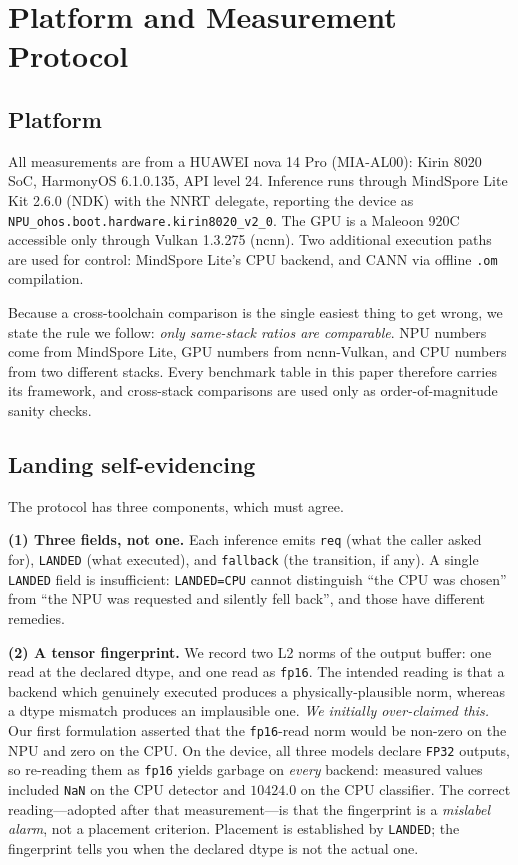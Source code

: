 \documentclass[conference]{IEEEtran}
\newcommand{\landed}{\texttt{LANDED}}
\newcommand{\reqf}{\texttt{req}}
\newcommand{\fbf}{\texttt{fallback}}
\begin{document}
\section{Platform and Measurement Protocol}
\label{sec:protocol}

\subsection{Platform}

All measurements are from a HUAWEI nova 14 Pro (MIA-AL00): Kirin 8020 SoC,
HarmonyOS 6.1.0.135, API level 24. Inference runs through MindSpore Lite Kit
2.6.0 (NDK) with the NNRT delegate, reporting the device as
\texttt{NPU\_ohos.boot.hardware.kirin8020\_v2\_0}. The GPU is a Maleoon 920C
accessible only through Vulkan 1.3.275 (ncnn). Two additional execution paths
are used for control: MindSpore Lite's CPU backend, and CANN via offline
\texttt{.om} compilation.

Because a cross-toolchain comparison is the single easiest thing to get wrong,
we state the rule we follow: \emph{only same-stack ratios are comparable}. NPU
numbers come from MindSpore Lite, GPU numbers from ncnn-Vulkan, and CPU numbers
from two different stacks. Every benchmark table in this paper therefore carries
its framework, and cross-stack comparisons are used only as order-of-magnitude
sanity checks.

\subsection{Landing self-evidencing}

The protocol has three components, which must agree.

\textbf{(1) Three fields, not one.} Each inference emits \reqf{} (what the caller
asked for), \landed{} (what executed), and \fbf{} (the transition, if any).
A single \landed{} field is insufficient: \texttt{LANDED=CPU} cannot distinguish
``the CPU was chosen'' from ``the NPU was requested and silently fell back'',
and those have different remedies.

\textbf{(2) A tensor fingerprint.} We record two L2 norms of the output buffer:
one read at the declared dtype, and one read as \texttt{fp16}. The intended
reading is that a backend which genuinely executed produces a
physically-plausible norm, whereas a dtype mismatch produces an implausible one.
\emph{We initially over-claimed this.} Our first formulation asserted that the
\texttt{fp16}-read norm would be non-zero on the NPU and zero on the CPU. On the
device, all three models declare \texttt{FP32} outputs, so re-reading them as
\texttt{fp16} yields garbage on \emph{every} backend: measured values included
\texttt{NaN} on the CPU detector and $10424.0$ on the CPU classifier. The
correct reading---adopted after that measurement---is that the fingerprint is a
\emph{mislabel alarm}, not a placement criterion. Placement is established by
\landed{}; the fingerprint tells you when the declared dtype is not the actual
one.
\end{document}
